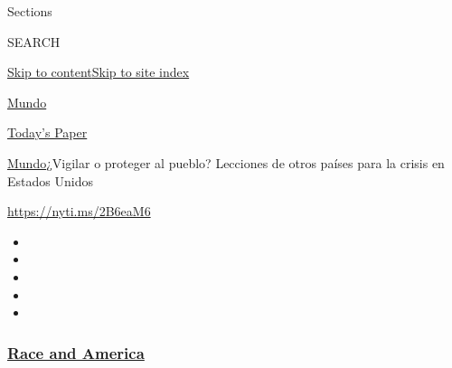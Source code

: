 Sections

SEARCH

\protect\hyperlink{site-content}{Skip to
content}\protect\hyperlink{site-index}{Skip to site index}

\href{https://www.nytimes3xbfgragh.onion/es/section/mundo}{Mundo}

\href{https://myaccount.nytimes3xbfgragh.onion/auth/login?response_type=cookie\&client_id=vi}{}

\href{https://www.nytimes3xbfgragh.onion/section/todayspaper}{Today's
Paper}

\href{/es/section/mundo}{Mundo}\textbar{}¿Vigilar o proteger al pueblo?
Lecciones de otros países para la crisis en Estados Unidos

\url{https://nyti.ms/2B6eaM6}

\begin{itemize}
\item
\item
\item
\item
\item
\end{itemize}

\hypertarget{race-and-america}{%
\subsubsection{\texorpdfstring{\href{https://www.nytimes3xbfgragh.onion/news-event/george-floyd-protests-minneapolis-new-york-los-angeles?name=styln-george-floyd\&region=TOP_BANNER\&variant=undefined\&block=storyline_menu_recirc\&action=click\&pgtype=Article\&impression_id=81bbdb70-e3a6-11ea-b968-698657e275f6}{Race
and America}}{Race and America}}\label{race-and-america}}

